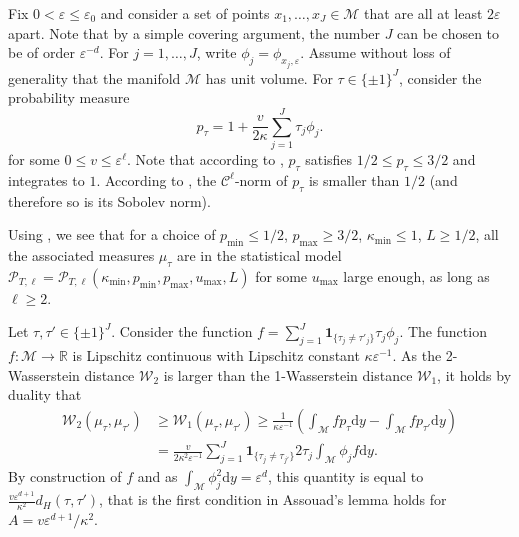 \documentclass[10pt,a4paper]{article}
\newcommand{\R}{{\mathbb R}}
\newcommand\cC{\mathcal{C}}
\newcommand\cM{\mathcal{M}}
\newcommand\W{\mathcal{W}}
\newcommand\cP{\mathcal{P}}
\newcommand\dd{\mathrm{d}}
\newcommand{\eps}{{\varepsilon}}
\begin{document}
Fix $0< \eps\le \eps_0$ and consider a set of points $x_1,\dots,x_J\in \cM$ that are all at least $2\eps$ apart. Note that by a simple covering argument, the number $J$ can be chosen to be of order $\eps^{-d}$. For $j=1,\dots,J$, write $\phi_j=\phi_{x_j,\eps}$. Assume without loss of generality that the manifold $\cM$ has unit volume. For $\tau\in \{\pm 1\}^J$, consider the probability measure
\[ p_\tau = 1+ \frac{v}{2\kappa} \sum_{j=1}^J \tau_j \phi_j.\]
for some $0\le v\le \eps^\ell$. Note that according to , $p_\tau$ satisfies $1/2\le p_{\tau}\le 3/2$ and integrates to $1$.  According to , the $\cC^\ell$-norm of $p_\tau$ is smaller than $1/2$ (and therefore so is its Sobolev norm). 




Using , 
we see that for a choice of $p_{\min}\le 1/2$, $p_{\max}\ge 3/2$, $\kappa_{\min}\le 1$, $L\ge 1/2$, all the associated measures $\mu_\tau$ are in the statistical model $\cP_{T,\ell}=\cP_{T,\ell}(\kappa_{\min},p_{\min},p_{\max},u_{\max},L)$ for some $u_{\max}$ large enough, as long as $\ell\ge 2$.


Let $\tau,\tau'\in \{\pm 1\}^J$. Consider the function $f= \sum_{j=1}^J \mathbf{1}_{\{\tau_j\neq \tau'_j\}}\tau_j \phi_j$. The function $f:\cM\to \R$ is  Lipschitz continuous with Lipschitz constant $\kappa\eps^{-1}$. 
As the 2-Wasserstein distance $\W_2$ is larger than the 1-Wasserstein distance $\W_1$, it holds by duality \cite[Particular Case 5.16]{villani2009optimal} that
\begin{align*}
\W_2(\mu_\tau,\mu_{\tau'})&\ge \W_1(\mu_\tau,\mu_{\tau'})\ge \frac{1}{\kappa\eps^{-1}} \left(\int_{\cM} fp_\tau \dd y -\int_{\cM} fp_{\tau'} \dd y\right) \\
&= \frac{v}{2\kappa^2\eps^{-1}}\sum_{j=1}^J \mathbf{1}_{\{\tau_j\neq \tau_{j'}\}} 2\tau_j\int_{\cM} \phi_jf \dd y.
\end{align*}
By construction of $f$ and as $\int_{\cM}\phi_j^2\dd y=\eps^d $, this quantity is equal to $\frac{v\eps^{d+1}}{\kappa^2} d_H(\tau,\tau')$, that is the first condition in Assouad's lemma holds for $A=v\eps^{d+1}/\kappa^2$.
\end{document}
